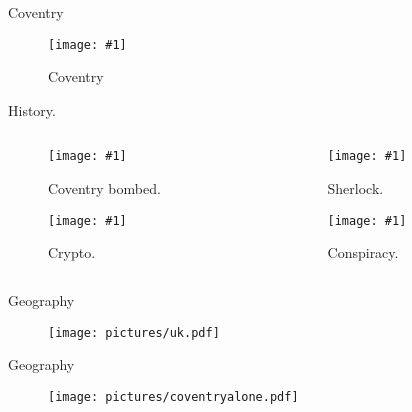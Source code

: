 \documentclass{beamer}
\newcommand{\insertfigure}[3] {

\begin{minipage}[b]{#2\linewidth}
    \texttt{[image: \#1]} 
    \caption{#3} 
\end{minipage} }
\newcommand{\insertf}[2]{\insertfigure{#1}{0.9}{#2}}
\newcommand{\insertpicture}[2]{
\begin{center}
  \begin{figure}
    \insertf{#1}{#2}
 \end{figure}
\end{center}
}
\begin{document}
\begin{frame}{Coventry}
  \insertpicture{pictures/coventry.jpg}{Coventry}
\end{frame}
\begin{frame}{History.}
\begin{columns}[T] %
\begin{column}{.48\textwidth}
\begin{figure}
  
  \insertf{coventryb.jpg}{Coventry bombed.}
  \pause
  \insertf{pictures/crypto.jpg}{Crypto.}
  \pause

 
\end{figure}
\end{column}%
\begin{column}{.40\textwidth}

\begin{figure}
  
  \insertf{pictures/Sherlock.jpg}{Sherlock.}
  \pause
  \insertf{pictures/consp.jpg}{Conspiracy.}
  
 
\end{figure}

  \end{column}%
\end{columns}

\end{frame}

\begin{frame}{Geography}
  \begin{figure}
  
     \begin{center}
	 \texttt{[image: pictures/uk.pdf]}
	 
  
    \end{center}

    
  \end{figure}

\end{frame}


\begin{frame}{Geography}
  \begin{figure}
  
     \begin{center}
	 \texttt{[image: pictures/coventryalone.pdf]}
	 
  
    \end{center}

    
  \end{figure}

\end{frame}
\end{document}
